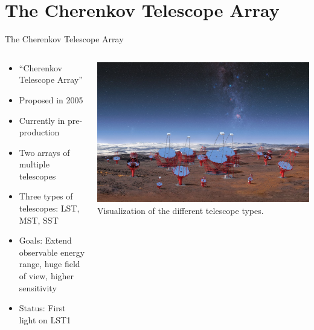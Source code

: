 \section{The Cherenkov Telescope Array}


\begin{frame}{The Cherenkov Telescope Array}
    \begin{columns}[T] %
        \begin{column}{.45\textwidth}
            \vspace{10pt}
            \begin{itemize}
                \item ``Cherenkov Telescope Array''
                \item Proposed in 2005
                \item Currently in pre-production
                \item Two arrays of multiple telescopes
                \item Three types of telescopes: LST, MST, SST
                \item Goals: Extend observable energy range, huge field of view, higher sensitivity
                \item Status: First light on LST1
            \end{itemize}
        \end{column}%
        \hfill%
        \begin{column}{.53\textwidth}
            \includegraphics[width=\linewidth]{images/cta_telescopes.jpg}
            Visualization of the different telescope types.
            \cite{cta_telescopes}
        \end{column}%
    \end{columns}

\end{frame}


